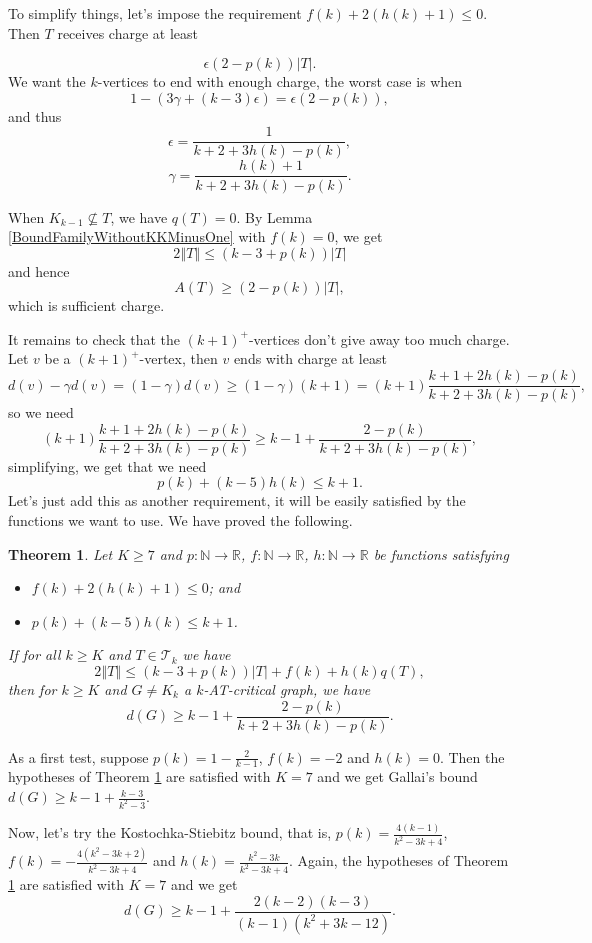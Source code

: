 \documentclass[12pt]{article}
\theoremstyle{plain}
\newtheorem{thm}{Theorem}[section]
\theoremstyle{definition}
\theoremstyle{remark}
\newcommand{\fancy}[1]{\mathcal{#1}}
\newcommand{\IN}{\mathbb{N}}
\newcommand{\IR}{\mathbb{R}}
\newcommand{\T}{\fancy{T}}
\newcommand{\card}[1]{\left|#1\right|}
\newcommand{\size}[1]{\left\Vert#1\right\Vert}
\newcommand{\func}[3]{#1\colon #2 \rightarrow #3}
\newcommand{\parens}[1]{\left( #1 \right)}
\begin{document}
To simplify things, let's impose the requirement $f(k) + 2(h(k) + 1) \le 0$.  Then $T$ receives charge at least

\[\epsilon\parens{2-p(k)}\card{T}.\]
We want the $k$-vertices to end with enough charge, the worst case is when
\[1 - (3\gamma + (k-3)\epsilon) = \epsilon\parens{2-p(k)},\]
and thus
\[\epsilon = \frac{1}{k+2 + 3h(k) - p(k)},\]
\[\gamma = \frac{h(k)+1}{k+2 + 3h(k) - p(k)}.\]

When $K_{k-1} \not \subseteq T$, we have $q(T) = 0$.  By Lemma \ref{BoundFamilyWithoutKKMinusOne} with $f(k) = 0$, we get 
\[2\size{T} \le (k-3 + p(k))\card{T}\]
and hence
\[A(T) \ge (2-p(k))\card{T},\]
which is sufficient charge.

It remains to check that the $(k+1)^+$-vertices don't give away too much charge.  Let $v$ be a $(k+1)^+$-vertex, then $v$ ends with charge at least
\[d(v) - \gamma d(v) = (1-\gamma)d(v) \ge (1-\gamma)(k+1) = (k+1)\frac{k+1 + 2h(k) - p(k)}{k+2 + 3h(k) - p(k)},\]
so we need
\[(k+1)\frac{k+1 + 2h(k) - p(k)}{k+2 + 3h(k) - p(k)} \ge k-1 + \frac{2-p(k)}{k+2 + 3h(k) - p(k)},\]
simplifying, we get that we need
\[p(k) + (k-5)h(k) \le k+1.\]
Let's just add this as another requirement, it will be easily satisfied by the functions we want to use.  We have proved the following.

\begin{thm}\label{UberTheorem}
	Let $K \ge 7$ and $\func{p}{\IN}{\IR}$, $\func{f}{\IN}{\IR}$, $\func{h}{\IN}{\IR}$ be functions satisfying
	\begin{itemize}
		\item $f(k) + 2(h(k) + 1) \le 0$; and
		\item $p(k) + (k-5)h(k) \le k+1$.
	\end{itemize}
    If for all $k \ge K$ and $T \in \T_k$ we have
	\[2\size{T} \le (k-3 + p(k))\card{T} + f(k) + h(k)q(T),\]
	then for $k \ge K$ and $G \ne K_k$ a $k$-AT-critical graph, we have
	\[d(G) \ge k-1 + \frac{2-p(k)}{k+2 + 3h(k) - p(k)}.\]
\end{thm}

As a first test, suppose $p(k) = 1 - \frac{2}{k-1}$, $f(k) = -2$ and $h(k) = 0$.  Then the hypotheses of Theorem \ref{UberTheorem} are satisfied with $K=7$ and we get Gallai's bound $d(G) \ge k-1 + \frac{k-3}{k^2-3}$. 

Now, let's try the Kostochka-Stiebitz bound, that is, $p(k) = \frac{4(k-1)}{k^2 - 3k + 4}$, $f(k) = -\frac{4(k^2-3k+2)}{k^2-3k+4}$ and $h(k) = \frac{k^2 - 3k}{k^2-3k+4}$.  Again, the hypotheses of Theorem \ref{UberTheorem} are satisfied with $K=7$ and we get
\[d(G) \ge k-1 + \frac{2(k-2)(k-3)}{(k-1)(k^2 + 3k - 12)}.\]
\end{document}
